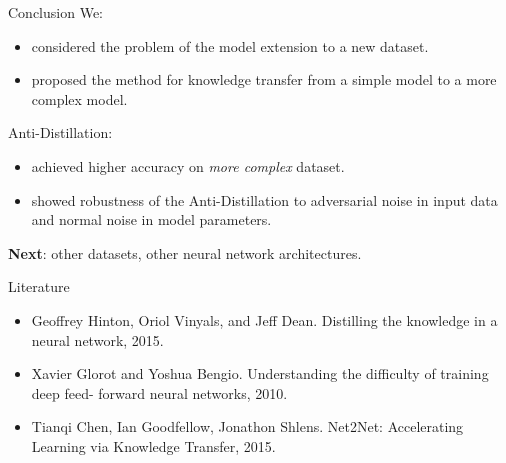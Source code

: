 \documentclass[dvipsnames,aspectratio=169]{beamer}
\begin{document}

\begin{frame}{Conclusion}
    We:
    \begin{itemize}
        \item considered the problem of the model extension to a new dataset.
        \item proposed the method for knowledge transfer from a simple model to a more complex model.
    \end{itemize}

    Anti-Distillation:
    \begin{itemize}
        \item achieved higher accuracy on \textit{more complex} dataset. 
        \item showed robustness of the Anti-Distillation to adversarial noise in input data and normal noise in model parameters.
    \end{itemize}

    \bigskip

    \textbf{Next}: other datasets, other neural network architectures.

\end{frame}



\begin{frame}{Literature}
    \begin{itemize}
        \item Geoffrey Hinton, Oriol Vinyals, and Jeff Dean. Distilling the knowledge in a neural network, 2015.
        \item Xavier Glorot and Yoshua Bengio. Understanding the difficulty of training deep feed- forward neural networks, 2010.
        \item Tianqi Chen, Ian Goodfellow, Jonathon Shlens. Net2Net: Accelerating Learning via Knowledge Transfer, 2015.
    \end{itemize}

\end{frame}
\end{document}

